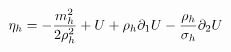 \documentclass[preview]{standalone}
\begin{document}
\begin{align*}
\special{dvisvgm:raw <g id='unique000'>}\eta_h=-\frac{m_h^2}{2\rho_h^2}+U+\rho_h\partial_1U-\frac{\rho_h}{\sigma_h}\partial_2U\special{dvisvgm:raw </g>}
\end{align*}
\end{document}
